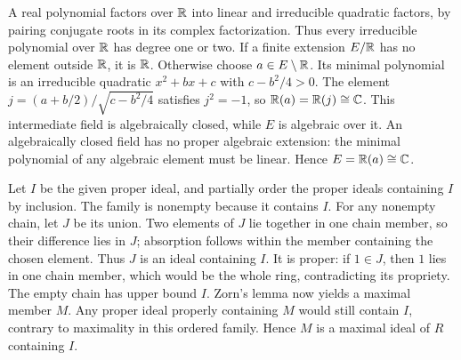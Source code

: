 A real polynomial factors over $\mathbb{R}$ into linear and irreducible quadratic factors, by pairing conjugate roots in its complex factorization. Thus every irreducible polynomial over $\mathbb{R}$ has degree one or two.
If a finite extension $E/\mathbb{R}$ has no element outside $\mathbb{R}$, it is $\mathbb{R}$. Otherwise choose $a\in E\setminus\mathbb{R}$. Its minimal polynomial is an irreducible quadratic $x^2+bx+c$ with $c-b^2/4>0$. The element $j=(a+b/2)/\sqrt{c-b^2/4}$ satisfies $j^2=-1$, so $\mathbb{R}(a)=\mathbb{R}(j)\cong\mathbb{C}$.
This intermediate field is algebraically closed, while $E$ is algebraic over it. An algebraically closed field has no proper algebraic extension: the minimal polynomial of any algebraic element must be linear. Hence $E=\mathbb{R}(a)\cong\mathbb{C}$.

Let $I$ be the given proper ideal, and partially order the proper ideals containing $I$ by inclusion. The family is nonempty because it contains $I$. For any nonempty chain, let $J$ be its union. Two elements of $J$ lie together in one chain member, so their difference lies in $J$; absorption follows within the member containing the chosen element. Thus $J$ is an ideal containing $I$.
It is proper: if $1\in J$, then $1$ lies in one chain member, which would be the whole ring, contradicting its propriety. The empty chain has upper bound $I$. Zorn's lemma now yields a maximal member $M$. Any proper ideal properly containing $M$ would still contain $I$, contrary to maximality in this ordered family. Hence $M$ is a maximal ideal of $R$ containing $I$.
